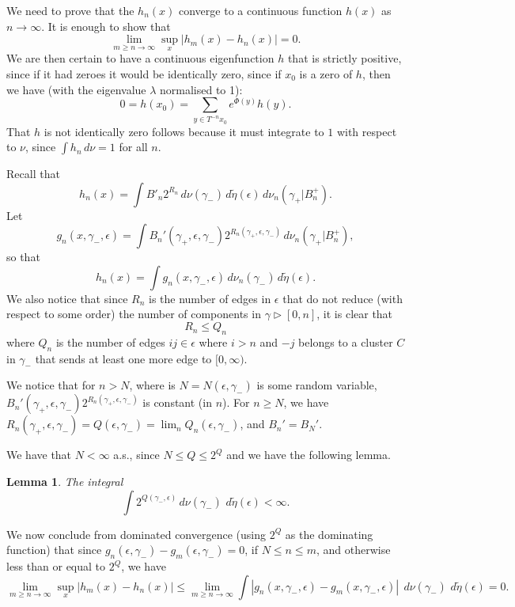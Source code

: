 \documentclass[11pt, a4paper]{amsart}
\newtheorem{lemma}[thm]{Lemma}
\theoremstyle{definition}
\theoremstyle{remark}
\renewcommand{\d}{\,d}
\providecommand{\e}{\epsilon}
\providecommand{\tl}{\tilde}
\providecommand{\g}{\gamma}
\begin{document}
We need to prove that the $h_n(x)$ converge to a continuous function $h(x)$ as
$n\to\infty$. It is enough to show that
$$ \lim_{m\geq n\to \infty}\sup_{x} |h_m(x)-h_n(x)|=0.$$
We are then certain to have a continuous eigenfunction $h$ that is strictly positive, since if it had zeroes it would be identically zero, since if $x_0$ is a zero of $h$, then we have (with the eigenvalue $\lambda $ normalised to 1):
$$0= h(x_0)=\sum_{y\in T^{-n}x_0} e^{\Phi(y)} h(y).$$
That $h$ is not identically zero follows because it must integrate to $1$ with respect to $\nu$, since $\int h_n \d\nu=1$ for all $n$.

Recall that
\begin{equation}\label{eq:3}
  h_n(x) =  \int B'_n 2^{R_n} \d \nu(\g_-)\d\tl\eta(\e) \d \nu_n(\g_+|B_n^+).
\end{equation}
Let 
$$g_n(x,\gamma_-,\epsilon)=\int B_n' (\gamma_+,\epsilon, \gamma_-) 2^{R_n(\gamma_+,\epsilon,\gamma_-)} \,d\nu_n(\g_+|B_n^+),$$
so that 
$$h_n(x)= \int g_n(x,\gamma_-,\epsilon) \d \nu_n(\g_-)\d\tl\eta(\e).$$
We also notice that since $R_n$ is the number of edges in $\e$ that do not reduce (with respect to
some order) the number of components in $\g\triangleright [0,n]$, it is clear
that
\begin{equation}\label{eq:RleQ}
  R_n \le Q_{n} 
\end{equation}
where \(Q_{n}\) is the number of edges $ij\in\e$ where $i>n$ and $-j$ belongs
to a cluster $C$ in $\g_-$ that sends at least one more edge to $[0,\infty)$.

We notice that  for $n>N$, where is $N=N(\epsilon, \gamma_-)$ is some random variable, $ B_n' (\gamma_+,\epsilon, \gamma_-) 2^{R_n(\gamma_+,\epsilon,\gamma_-)} $ is constant (in $n$). For $n\geq N$, we have $R_n(\gamma_+,\epsilon,\gamma_-)=Q(\epsilon, \gamma_-)=\lim_n Q_n(\epsilon, \gamma_-)$, and $B_n'=B_N'$.

We have that $N<\infty$ a.s., since $N\leq Q\leq 2^Q$ and we have the following lemma.
\begin{lemma}\label{lem:qn}
  The integral
  $$
    \int 2^{Q(\gamma_-,\epsilon)} \d\nu(\g_-)\, \d\tilde\eta(\e) <\infty.
  $$
\end{lemma}
We now conclude from dominated convergence (using $2^Q$ as the dominating function) that since $g_n(\epsilon, \gamma_-)-g_m(\epsilon, \gamma_-)=0$, if $N\leq n\leq m$, and otherwise less than or equal to $2^Q$, we have 
$$ \lim_{m\geq n\to \infty}\sup_{x} |h_m(x)-h_n(x)|\leq \lim_{m\geq n\to \infty} \int |g_n(x,\gamma_-,\epsilon)-g_m(x,\gamma_-,\epsilon)   |\; \d\nu(\g_-)\, \d\tilde\eta(\e)=0.$$
\end{document}
